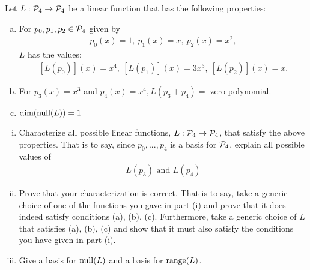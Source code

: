 \begin{question}
    \normalfont
    Let $L:\P_4\rightarrow\P_4$ be a linear function that has the following properties:
    \begin{enumerate}[(a)]
        \item For $p_0,p_1,p_2\in\P_4$ given by 
        \[
            \begin{aligned}
                p_0(x)=1,\ p_1(x)=x,\ p_2(x)=x^2,
            \end{aligned}
        \]
        $L$ has the values: 
        \[
            \begin{aligned}
                [L(p_0)](x)=x^4,\ [L(p_1)](x)=3x^3,\ [L(p_2)](x)=x.
            \end{aligned}
        \]
        \item For $p_3(x)=x^3$ and $p_4(x)=x^4,L(p_3+p_4)=$ zero polynomial.
        \item $\dim(\nullla(L))=1$
    \end{enumerate}
    \begin{enumerate}[(i)]
        \item Characterize all possible linear functions, $L:\P_4\rightarrow\P_4$, that satisfy the above properties. That is to say, since ${p_0,...,p_4}$ is a basis for $\P_4$, explain all possible values of 
        \[
            \begin{aligned}
                L(p_3)\text{  and  }L(p_4)
            \end{aligned}
        \]
        \item Prove that your characterization is correct. That is to say, take a generic choice of one of the functions you gave in part (i) and prove that it does indeed satisfy conditions (a), (b), (c). Furthermore, take a generic choice of $L$ that satisfies (a), (b), (c) and show that it must also satisfy the conditions you have given in part (i).
        \item Give a basis for $\nullla(L)$ and a basis for $\range(L)$.
    \end{enumerate}
\end{question}

